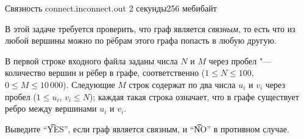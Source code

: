 \begin{problem}{Связность}
{connect.in}{connect.out}
{2 секунды}{256 мебибайт}{}

 В этой задаче требуется проверить, что граф является {\it связным}, то есть
 что из любой вершины можно по рёбрам этого графа попасть в любую другую.

\InputFile

 В первой строке входного файла заданы числа $N$ и $M$ через пробел "---
 количество вершин и рёбер в графе, соответственно
 ($1 \leqslant N \leqslant 100$, $0 \leqslant M \leqslant 10 \, 000$).
 Следующие $M$ строк содержат по два числа $u_i$ и $v_i$ через пробел
 ($1 \leqslant u_i, \, v_i \leqslant N$);
 каждая такая строка означает, что в графе существует ребро между вершинами
 $u_i$ и $v_i$.

\OutputFile

 Выведите ``\t{YES}'', если граф является связным, и ``\t{NO}'' в противном
 случае.

\Examples

\begin{example}
%
%
\end{example}

\end{problem}
